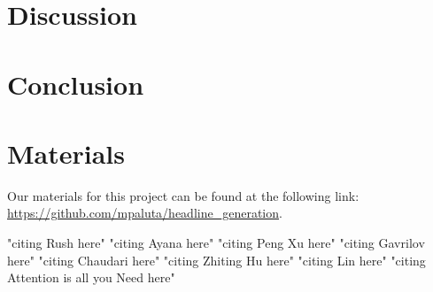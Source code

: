 \documentclass[11pt]{article}
\begin{document}
\section{Discussion}
\section{Conclusion}



\section{Materials}
Our materials for this project can be found at the following link:
\url{https://github.com/mpaluta/headline_generation}.

"citing Rush here" \citep{rush2015neural}
"citing Ayana here" \cite{Ayana2017}
"citing Peng Xu here" \cite{DBLP:journals/corr/abs-1902-07110}
"citing Gavrilov here" \cite{DBLP:journals/corr/abs-1901-07786}
"citing Chaudari here" \cite{DBLP:journals/corr/abs-1802-09426}
"citing Zhiting Hu here" \cite{DBLP:journals/corr/HuYLSX17}
"citing Lin here" \cite{lin-2004-rouge}
"citing Attention is all you Need here" \cite{DBLP:journals/corr/VaswaniSPUJGKP17}



\end{document}
